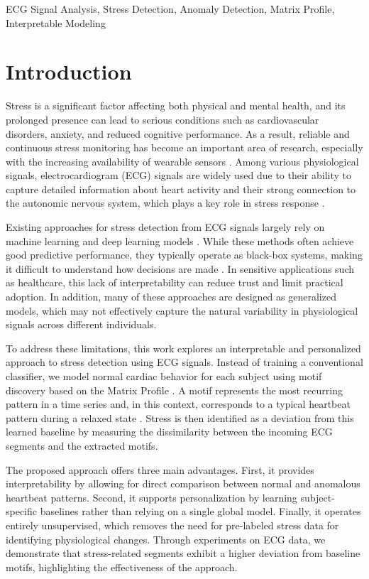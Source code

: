 \documentclass[conference,10pt]{IEEEtran}
\begin{document}
\begin{IEEEkeywords}
ECG Signal Analysis, Stress Detection, Anomaly Detection, Matrix Profile, Interpretable Modeling
\end{IEEEkeywords}

\section{Introduction}
Stress is a significant factor affecting both physical and mental health, and its prolonged presence can lead to serious conditions such as cardiovascular disorders, anxiety, and reduced cognitive performance. As a result, reliable and continuous stress monitoring has become an important area of research, especially with the increasing availability of wearable sensors \cite{r1}. Among various physiological signals, electrocardiogram (ECG) signals are widely used due to their ability to capture detailed information about heart activity and their strong connection to the autonomic nervous system, which plays a key role in stress response \cite{r2}.

Existing approaches for stress detection from ECG signals largely rely on machine learning and deep learning models \cite{r1, r3}. While these methods often achieve good predictive performance, they typically operate as black-box systems, making it difficult to understand how decisions are made \cite{r4}. In sensitive applications such as healthcare, this lack of interpretability can reduce trust and limit practical adoption. In addition, many of these approaches are designed as generalized models, which may not effectively capture the natural variability in physiological signals across different individuals.

To address these limitations, this work explores an interpretable and personalized approach to stress detection using ECG signals. Instead of training a conventional classifier, we model normal cardiac behavior for each subject using motif discovery based on the Matrix Profile \cite{r5}. A motif represents the most recurring pattern in a time series and, in this context, corresponds to a typical heartbeat pattern during a relaxed state \cite{r6}. Stress is then identified as a deviation from this learned baseline by measuring the dissimilarity between the incoming ECG segments and the extracted motifs.

The proposed approach offers three main advantages. First, it provides interpretability by allowing for direct comparison between normal and anomalous heartbeat patterns. Second, it supports personalization by learning subject-specific baselines rather than relying on a single global model. Finally, it operates entirely unsupervised, which removes the need for pre-labeled stress data for identifying physiological changes.
Through experiments on ECG data, we demonstrate that stress-related segments exhibit a higher deviation from baseline motifs, highlighting the effectiveness of the approach.
\end{document}
